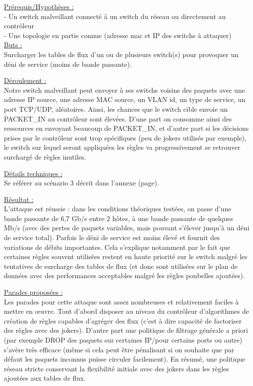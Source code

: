 \underline{Prérequis/Hypothèses :}\\
- Un switch malveillant connecté à un switch du réseau ou directement au contrôleur\\
- Une topologie en partie connue (adresse mac et IP des switchs à attaquer)\\


\underline{Buts :}\\
Surcharger les tables de flux d’un ou de plusieurs switch(s) pour provoquer un déni de service (moins de bande passante).

\underline{Déroulement :}\\
Notre switch malveillant peut envoyer à ses switchs voisins des paquets avec une adresse IP source, une adresse MAC source, un VLAN id, un type de service, un port TCP/UDP, aléatoires. Ainsi, les chances que le switch cible envoie un PACKET\_IN au contrôleur sont élevées. D’une part on consomme ainsi des ressources en envoyant beaucoup de PACKET\_IN, et d’autre part si les décisions prises par le contrôleur sont trop spécifiques (peu de jokers utilisés par exemple), le switch sur lequel seront appliquées les règles va progressivement se retrouver surchargé de règles inutiles.

\underline{Détails techniques :}\\
Se référer au scénario 3 décrit dans l'annexe (page).

\underline{Résultat :}\\
L’attaque est réussie : dans les conditions théoriques testées, on passe d’une bande passante de 6,7 Gb/s entre 2 hôtes, à une bande passante de quelques Mb/s (avec des pertes de paquets variables, mais pouvant s'élever jusqu'à un déni de service total). Parfois le déni de service est moins élevé et fournit des variations de débits importantes. Cela s'explique notamment par le fait que certaines règles souvent utilisées restent en haute priorité sur le switch malgré les tentatives de surcharge des tables de flux (et donc sont utilisées sur le plan de données avec des performances acceptables malgré les règles poubelles ajoutées).

\underline{Parades proposées :}\\
Les parades pour cette attaque sont assez nombreuses et relativement faciles à mettre en œuvre. Tout d’abord disposer au niveau du contrôleur d’algorithmes de création de règles capables d’agréger des flux (c'est à dire capacité de factoriser des règles avec des jokers). D’autre part une politique de filtrage générale a priori (par exemple DROP des paquets sur certaines IP/pour certains ports ou autre) s’avère très efficace (même si cela peut être pénalisant si on souhaite que par défaut les paquets inconnus puisse circuler facilement). En résumé, une politique réseau stricte conservant la flexibilité initiale avec des jokers dans les règles ajoutées aux tables de flux.

